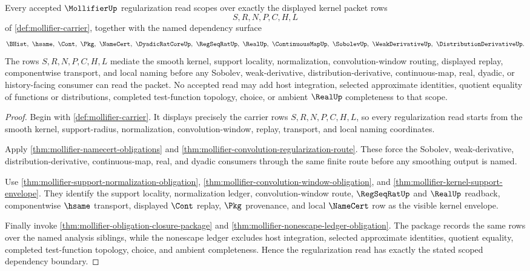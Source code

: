 \begin{theorem}
\label{thm:mollifier-scoped-kernel-dependency-boundary}
Every accepted $\MollifierUp$ regularization read scopes over exactly the
displayed kernel packet rows
$$
S,R,N,P,C,H,L
$$
of \autoref{def:mollifier-carrier}, together with the named dependency surface
$$
\BHist,\ \hsame,\ \Cont,\ \Pkg,\ \NameCert,\ \DyadicRatCoreUp,\ \RegSeqRatUp,\ \RealUp,\ \ContinuousMapUp,\ \SobolevUp,\ \WeakDerivativeUp,\ \DistributionDerivativeUp .
$$
The rows $S,R,N,P,C,H,L$ mediate the smooth kernel, support locality,
normalization, convolution-window routing, displayed replay, componentwise
transport, and local naming before any Sobolev, weak-derivative,
distribution-derivative, continuous-map, real, dyadic, or history-facing
consumer can read the packet. No accepted read may add host integration,
selected approximate identities, quotient equality of functions or
distributions, completed test-function topology, choice, or ambient
$\RealUp$ completeness to that scope.
\end{theorem}
\begin{proof}
Begin with \autoref{def:mollifier-carrier}. It displays precisely the carrier
rows $S,R,N,P,C,H,L$, so every regularization read starts from the smooth
kernel, support-radius, normalization, convolution-window, replay, transport,
and local naming coordinates.

Apply \autoref{thm:mollifier-namecert-obligations} and
\autoref{thm:mollifier-convolution-regularization-route}. These force the
Sobolev, weak-derivative, distribution-derivative, continuous-map, real, and
dyadic consumers through the same finite route before any smoothing output is
named.

Use \autoref{thm:mollifier-support-normalization-obligation},
\autoref{thm:mollifier-convolution-window-obligation}, and
\autoref{thm:mollifier-kernel-support-envelope}. They identify the support
locality, normalization ledger, convolution-window route, $\RegSeqRatUp$ and
$\RealUp$ readback, componentwise $\hsame$ transport, displayed $\Cont$ replay,
$\Pkg$ provenance, and local $\NameCert$ row as the visible kernel envelope.

Finally invoke \autoref{thm:mollifier-obligation-closure-package} and
\autoref{thm:mollifier-nonescape-ledger-obligation}. The package records the
same rows over the named analysis siblings, while the nonescape ledger excludes
host integration, selected approximate identities, quotient equality,
completed test-function topology, choice, and ambient completeness. Hence the
regularization read has exactly the stated scoped dependency boundary.
\end{proof}

